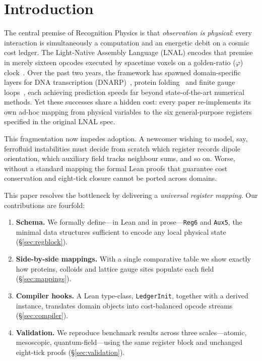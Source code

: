 \documentclass[11pt,a4paper]{article}
\begin{document}
\section{Introduction}\label{sec:intro}
The central premise of Recognition Physics is that \emph{observation is physical}: every interaction is simultaneously a computation and an energetic debit on a cosmic cost ledger.  The Light-Native Assembly Language (LNAL) encodes that premise in merely sixteen opcodes executed by spacetime voxels on a golden-ratio ($\varphi$) clock~\cite{Washburn2025_LNAL}.  Over the past two years, the framework has spawned domain-specific layers for DNA transcription (DNARP)~\cite{DNARP2024}, protein folding~\cite{ProteinLedger2025} and finite gauge loops~\cite{VoxelWalks2025}, each achieving prediction speeds far beyond state-of-the-art numerical methods.  Yet these successes share a hidden cost: every paper re-implements its own ad-hoc mapping from physical variables to the six general-purpose registers specified in the original LNAL spec.

This fragmentation now impedes adoption.  A newcomer wishing to model, say, ferrofluid instabilities must decide from scratch which register records dipole orientation, which auxiliary field tracks neighbour sums, and so on.  Worse, without a standard mapping the formal Lean proofs that guarantee cost conservation and eight-tick closure cannot be ported across domains.

This paper resolves the bottleneck by delivering a \emph{universal register mapping}.  Our contributions are fourfold:
\begin{enumerate}
\item \textbf{Schema.}  We formally define---in Lean and in prose---\texttt{Reg6} and \texttt{Aux5}, the minimal data structures sufficient to encode any local physical state (§\ref{sec:regblock}).
\item \textbf{Side-by-side mappings.}  With a single comparative table we show exactly how proteins, colloids and lattice gauge sites populate each field (§\ref{sec:mappings}).
\item \textbf{Compiler hooks.}  A Lean type-class, \texttt{LedgerInit}, together with a derived instance, translates domain objects into cost-balanced opcode streams (§\ref{sec:compiler}).
\item \textbf{Validation.}  We reproduce benchmark results across three scales—atomic, mesoscopic, quantum-field—using the same register block and unchanged eight-tick proofs (§\ref{sec:validation}).
\end{enumerate}
\end{document}
